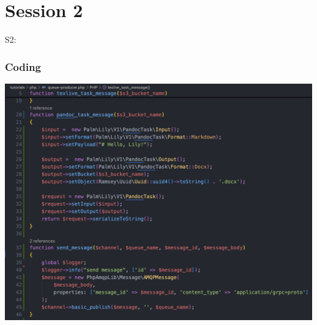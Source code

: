 \section{Session 2}

S2:

\begin{frame}
    \frametitle{Coding}
    \centering
    \includegraphics[scale=0.6]{coding.png}
\end{frame}
